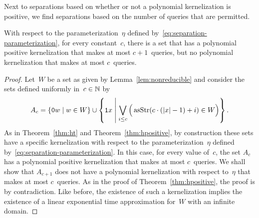 Next to separations based on whether or not a polynomial kernelization is positive, we find separations based on the number of queries that are permitted.
\begin{theorem}
\label{thm:hc}%
  With respect to the parameterization~$\eta$ defined by~\eqref{eq:separation-parameterization}, for every constant~$c$, there is a set that has a polynomial positive kernelization that makes at most $c + 1$~queries, but no polynomial kernelization that makes at most $c$~queries.
\end{theorem}
\begin{proof}
  Let~$W$ be a set as given by Lemma~\ref{lem:nonreducible} and consider the sets defined uniformly in~$c \in \bbN$ by
  \begin{equation*}
    A_c \deq \{\bits{0}w \st w \in W\} \cup \left\{\bits{1}x \st[\middle] \bigvee_{i \le c} \Big(\asStr(c \cdot (\length{x} - 1) + i) \in W\Big)\right\}.
  \end{equation*}
  As in Theorem~\ref{thm:ht} and Theorem~\ref{thm:hpositive}, by construction these sets have a specific kernelization with respect to the parameterization~$\eta$ defined by~\eqref{eq:separation-parameterization}.
  In this case, for every value of~$c$, the set $A_c$ has a polynomial positive kernelization that makes at most $c$~queries.
  We shall show that $A_{c + 1}$ does not have a polynomial kernelization with respect to~$\eta$ that makes at most $c$~queries.
  As in the proof of Theorem~\ref{thm:hpositive}, the proof is by contradiction.
  Like before, the existence of such a kernelization implies the existence of a linear exponential time approximation for~$W$ with an infinite domain.


\end{proof}
